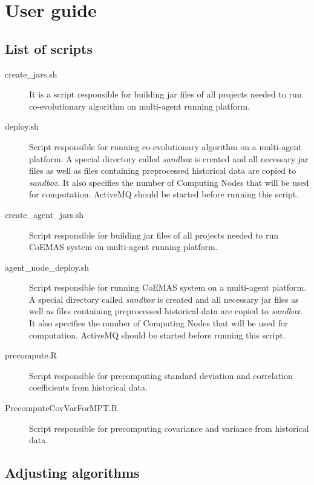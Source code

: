 \appendix
\chapter{User guide}
\label{cha:user_guide}



\section{List of scripts}

\begin{description}
  \item [create\_jars.sh]
      It is a script responsible for building jar files of all projects needed to run co-evolutionary algorithm on multi-agent running platform. 
  \item [deploy.sh]
      Script responsible for running co-evolutionary algorithm on a multi-agent platform.
      A special directory called \emph{sandbox} is created and all necessary jar files as well as files containing preprocessed historical data are copied to \emph{sandbox}.
      It also specifies the number of Computing Nodes that will be used for computation.
      ActiveMQ should be started before running this script.
  \item [create\_agent\_jars.sh]
      Script responsible for building jar files of all projects needed to run CoEMAS system on multi-agent running platform. 
  \item [agent\_node\_deploy.sh]
      Script responsible for running CoEMAS system on a multi-agent platform.
      A special directory called \emph{sandbox} is created and all necessary jar files as well as files containing preprocessed historical data are copied to \emph{sandbox}.
      It also specifies the number of Computing Nodes that will be used for computation.
      ActiveMQ should be started before running this script. 
  \item [precompute.R]
      Script responsible for precomputing standard deviation and correlation coefficients from historical data.
  \item [PrecomputeCovVarForMPT.R]
      Script responsible for precomputing covariance and variance from historical data. 

\end{description}



\section{Adjusting algorithms}

